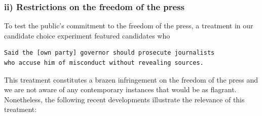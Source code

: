 \documentclass[12pt]{article}
\begin{document}
\subsubsection*{ii) Restrictions on the freedom of the press}

To test the public's commitment to the freedom of the press, a treatment in our candidate choice experiment featured candidates who
\begin{center}
\begin{varwidth}{\linewidth}
\begin{verbatim}
Said the [own party] governor should prosecute journalists
who accuse him of misconduct without revealing sources.
\end{verbatim}
\end{varwidth}
\end{center}

This treatment constitutes a brazen infringement on the freedom of the press and we are not aware of any contemporary instances that would be as flagrant. Nonetheless, the following recent developments illustrate the relevance of this treatment:
\end{document}
